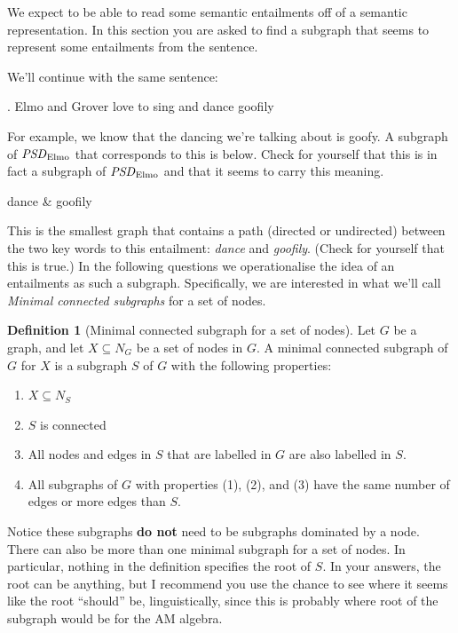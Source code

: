\documentclass[addpoints
]{exam}
\theoremstyle{definition}
\newtheorem{definition}{Definition}[section]
\newcommand{\graphname}[2]{\ensuremath{\text{\textit{#1}}_{\text{#2}}}}
\begin{document}
\begin{questions}
    
  \question \label{entail} We expect to be able to read some semantic entailments off of a semantic representation. In this section you are asked to find a subgraph that seems to represent some entailments from the sentence.

    We'll continue with the same sentence:
    
    \ex. Elmo and Grover love to sing and dance goofily \label{ex:elmo}

    For example, we know that the dancing we're talking about is goofy. A subgraph of \graphname{PSD}{Elmo} that corresponds to this is below. Check for yourself that this is in fact a subgraph of \graphname{PSD}{Elmo} and that it seems to carry this meaning.

    \begin{dependency}
      \begin{deptext}[column sep=0.7cm]
      dance \& goofily \\
    \end{deptext}

  \end{dependency}

  This is the smallest graph that contains a path (directed or undirected) between the two key words to this entailment: \textit{dance} and \textit{goofily}. (Check for yourself that this is true.) In the following questions we operationalise the idea of an entailments as such a subgraph. Specifically, we are interested in what we'll call \textit{Minimal connected subgraphs} for a set of nodes.

  \begin{definition}[Minimal connected subgraph for a set of nodes]
    Let $G$ be a graph, and let $X\subseteq N_G$ be a set of nodes in $G$. A minimal connected subgraph of $G$ for $X$ is a subgraph $S$ of $G$ with the following properties:
    \begin{enumerate}
    \item $X\subseteq N_S$
    \item $S$ is connected
    \item All nodes and edges in $S$ that are labelled in $G$ are also labelled in $S$.
    \item All subgraphs of $G$ with properties (1), (2), and (3) have the same number of edges or more edges than $S$.
    \end{enumerate}
  \end{definition}

  Notice these subgraphs \textbf{do not} need to be subgraphs dominated by a node. There can also be more than one minimal subgraph for a set of nodes. In particular, nothing in the definition specifies the root of $S$. In your answers, the root can be anything, but I recommend you use the chance to see where it seems like the root ``should'' be, linguistically, since this is probably where root of the subgraph would be for the AM algebra.


\end{questions}
\end{document}
